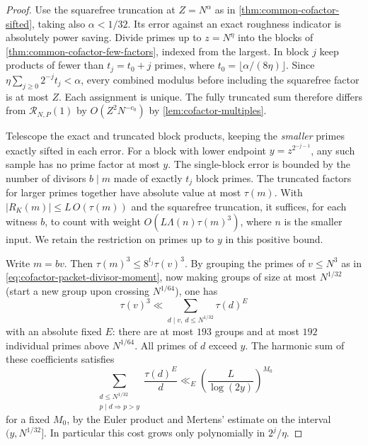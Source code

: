 \documentclass[11pt,a4paper]{article}
\numberwithin{equation}{section}
\begin{document}
\begin{proof}
Use the squarefree truncation at $Z=N^\alpha$ as in
\cref{thm:common-cofactor-sifted}, taking also $\alpha<1/32$.
Its error against an exact roughness indicator is absolutely
power saving. Divide primes up to $z=N^\eta$ into the blocks of
\cref{thm:common-cofactor-few-factors}, indexed from the largest.
In block $j$ keep products of fewer than $t_j=t_0+j$ primes,
where $t_0=\lfloor\alpha/(8\eta)\rfloor$. Since
$\eta\sum_{j\ge0}2^{-j}t_j<\alpha$, every combined modulus
before including the squarefree factor is at most $Z$. Each
assignment is unique. The fully truncated sum therefore differs
from $\mathcal R_{N,P}(1)$ by $O(Z^2N^{-c_0})$ by
\cref{lem:cofactor-multiples}.

Telescope the exact and truncated block products, keeping the
\emph{smaller} primes exactly sifted in each error. For a block
with lower endpoint $y=z^{2^{-j-1}}$, any such sample has no
prime factor at most $y$. The single-block error is bounded by
the number of divisors $b\mid m$ made of exactly $t_j$ block
primes. The truncated factors for larger primes together have
absolute value at most $\tau(m)$. With $|R_K(m)|\le L\,O(\tau(m))$
and the squarefree truncation, it suffices, for each witness $b$,
to count with weight $O(L\Lambda(n)\tau(m)^3)$, where $n$ is
the smaller input. We retain the restriction on primes up to
$y$ in this positive bound.

Write $m=bv$. Then $\tau(m)^3\le 8^{t_j}\tau(v)^3$. By
grouping the primes of $v\le N^3$ as in
\eqref{eq:cofactor-packet-divisor-moment}, now making groups of
size at most $N^{1/32}$ (start a new group upon crossing
$N^{1/64}$), one has
\[
 \tau(v)^3\ll\sum_{d\mid v,\ d\le N^{1/32}}\tau(d)^E
\]
with an absolute fixed $E$: there are at most $193$ groups
and at most $192$ individual primes above $N^{1/64}$.
All primes of $d$ exceed $y$. The harmonic sum of these
coefficients satisfies
\[
 \sum_{\substack{d\le N^{1/32}\\p\mid d\Rightarrow p>y}}
       \frac{\tau(d)^E}{d}
 \ll_E \left(\frac{L}{\log(2y)}\right)^{M_0}
\]
for a fixed $M_0$, by the Euler product and Mertens' estimate
on the interval $(y,N^{1/32}]$. In particular this cost grows
only polynomially in $2^j/\eta$.


\end{proof}
\end{document}
